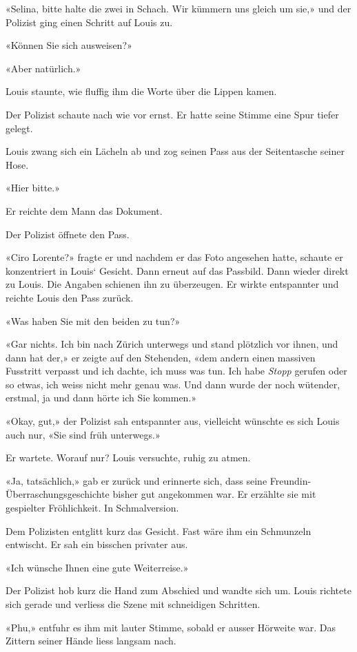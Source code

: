 «Selina, bitte halte die zwei in Schach. Wir kümmern uns gleich um sie,»
und der Polizist ging einen Schritt auf Louis zu.

«Können Sie sich ausweisen?»

«Aber natürlich.»

Louis staunte, wie fluffig ihm die Worte über die Lippen kamen.

Der Polizist schaute nach wie vor ernst. Er hatte seine Stimme eine Spur
tiefer gelegt.

Louis zwang sich ein Lächeln ab und zog seinen Pass aus der Seitentasche
seiner Hose.

«Hier bitte.»

Er reichte dem Mann das Dokument.

Der Polizist öffnete den Pass.

«Ciro Lorente?» fragte er und nachdem er das Foto angesehen hatte,
schaute er konzentriert in Louis` Gesicht. Dann erneut auf das Passbild.
Dann wieder direkt zu Louis. Die Angaben schienen ihn zu überzeugen. Er
wirkte entspannter und reichte Louis den Pass zurück.

«Was haben Sie mit den beiden zu tun?»

«Gar nichts. Ich bin nach Zürich unterwegs und stand plötzlich vor
ihnen, und dann hat der,» er zeigte auf den Stehenden, «dem andern einen
massiven Fusstritt verpasst und ich dachte, ich muss was tun. Ich habe
\emph{Stopp} gerufen oder so etwas, ich weiss nicht mehr genau was. Und
dann wurde der noch wütender, erstmal, ja und dann hörte ich Sie
kommen.»

«Okay, gut,» der Polizist sah entspannter aus, vielleicht wünschte es
sich Louis auch nur, «Sie sind früh unterwegs.»

Er wartete. Worauf nur? Louis versuchte, ruhig zu atmen.

«Ja, tatsächlich,» gab er zurück und erinnerte sich, dass seine
Freundin-Überraschungsgeschichte bisher gut angekommen war. Er erzählte
sie mit gespielter Fröhlichkeit. In Schmalversion.

Dem Polizisten entglitt kurz das Gesicht. Fast wäre ihm ein Schmunzeln
entwischt. Er sah ein bisschen privater aus.

«Ich wünsche Ihnen eine gute Weiterreise.»

Der Polizist hob kurz die Hand zum Abschied und wandte sich um. Louis
richtete sich gerade und verliess die Szene mit schneidigen Schritten.

«Phu,» entfuhr es ihm mit lauter Stimme, sobald er ausser Hörweite war.
Das Zittern seiner Hände liess langsam nach.

